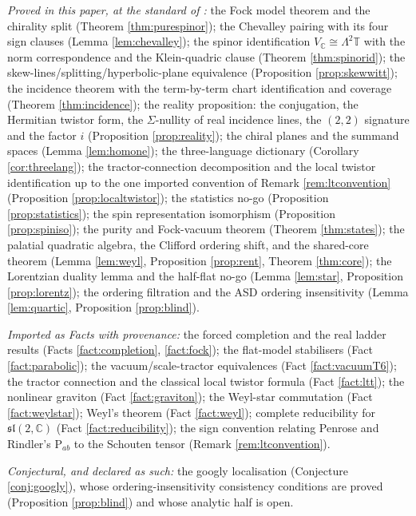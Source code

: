 \documentclass[11pt]{article}
\theoremstyle{definition}
\newcommand{\C}{\mathbb{C}}
\newcommand{\T}{\mathbb{T}}
\begin{document}
\emph{Proved in this paper, at the standard of \cite{ButlerT1}:} the Fock model theorem and the chirality split (Theorem \ref{thm:purespinor}); the Chevalley pairing with its four sign clauses (Lemma \ref{lem:chevalley}); the spinor identification $V_\C \cong \Lambda^2\T$ with the norm correspondence and the Klein-quadric clause (Theorem \ref{thm:spinorid}); the skew-lines/splitting/hyperbolic-plane equivalence (Proposition \ref{prop:skewwitt}); the incidence theorem with the term-by-term chart identification and coverage (Theorem \ref{thm:incidence}); the reality proposition: the conjugation, the Hermitian twistor form, the $\Sigma$-nullity of real incidence lines, the $(2,2)$ signature and the factor $i$ (Proposition \ref{prop:reality}); the chiral planes and the summand spaces (Lemma \ref{lem:homone}); the three-language dictionary (Corollary \ref{cor:threelang}); the tractor-connection decomposition and the local twistor identification up to the one imported convention of Remark \ref{rem:ltconvention} (Proposition \ref{prop:localtwistor}); the statistics no-go (Proposition \ref{prop:statistics}); the spin representation isomorphism (Proposition \ref{prop:spiniso}); the purity and Fock-vacuum theorem (Theorem \ref{thm:states}); the palatial quadratic algebra, the Clifford ordering shift, and the shared-core theorem (Lemma \ref{lem:weyl}, Proposition \ref{prop:rent}, Theorem \ref{thm:core}); the Lorentzian duality lemma and the half-flat no-go (Lemma \ref{lem:star}, Proposition \ref{prop:lorentz}); the ordering filtration and the ASD ordering insensitivity (Lemma \ref{lem:quartic}, Proposition \ref{prop:blind}).

\emph{Imported as Facts with provenance:} the forced completion and the real ladder results (Facts \ref{fact:completion}, \ref{fact:fock}); the flat-model stabilisers (Fact \ref{fact:parabolic}); the vacuum/scale-tractor equivalences (Fact \ref{fact:vacuumT6}); the tractor connection and the classical local twistor formula (Fact \ref{fact:ltt}); the nonlinear graviton (Fact \ref{fact:graviton}); the Weyl-star commutation (Fact \ref{fact:weylstar}); Weyl's theorem (Fact \ref{fact:weyl}); complete reducibility for $\mathfrak{sl}(2,\C)$ (Fact \ref{fact:reducibility}); the sign convention relating Penrose and Rindler's $\mathrm{P}_{ab}$ to the Schouten tensor (Remark \ref{rem:ltconvention}).

\emph{Conjectural, and declared as such:} the googly localisation (Conjecture \ref{conj:googly}), whose ordering-insensitivity consistency conditions are proved (Proposition \ref{prop:blind}) and whose analytic half is open.
\end{document}
